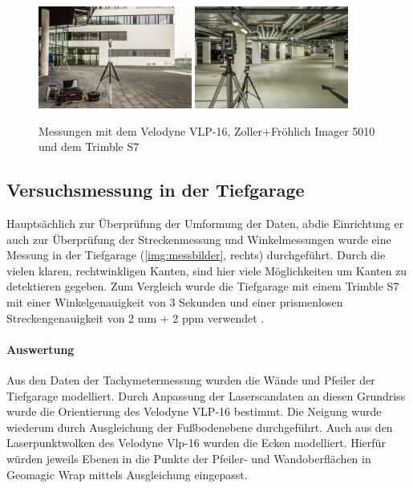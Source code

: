\documentclass[a4paper,12pt,bibliography=totoc, listof=totoc,titlepage,pointlessnumbers]{scrreprt}
\begin{document}
\begin{figure}
 \centering
 \includegraphics[width=0.45\textwidth]{./img/fassade.jpg}
 \includegraphics[width=0.45\textwidth]{./img/tiefgarage.jpg}
 \caption{Messungen mit dem Velodyne VLP-16, Zoller+Fröhlich Imager 5010 und dem Trimble S7}
 \label{img:messbilder}
\end{figure}

\subsection{Versuchsmessung in der Tiefgarage}
Hauptsächlich zur Überprüfung der Umformung der Daten, abdie Einrichtung er auch zur Überprüfung der Streckenmessung und Winkelmessungen wurde eine Messung in der Tiefgarage (\autoref{img:messbilder}, rechts) durchgeführt. Durch die vielen klaren, rechtwinkligen Kanten, sind hier viele Möglichkeiten um Kanten zu detektieren gegeben. Zum Vergleich wurde die Tiefgarage mit einem Trimble S7 mit einer Winkelgenauigkeit von 3 Sekunden und einer prismenlosen Streckengenauigkeit von 2 mm + 2 ppm verwendet \citep{trimbles7}.

\paragraph{Auswertung}
Aus den Daten der Tachymetermessung wurden die Wände und Pfeiler der Tiefgarage modelliert. Durch Anpassung der Laserscandaten an diesen Grundriss wurde die Orientierung des Velodyne VLP-16 bestimmt. Die Neigung wurde wiederum durch Ausgleichung der Fußbodenebene durchgeführt. Auch aus den Laserpunktwolken des Velodyne Vlp-16 wurden die Ecken modelliert. Hierfür würden jeweils Ebenen in die Punkte der Pfeiler- und Wandoberflächen in Geomagic Wrap mittels Ausgleichung eingepasst.
\end{document}
